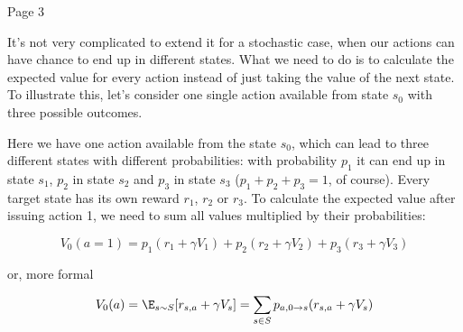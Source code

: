 Page 3

It’s not very complicated to extend it for a stochastic case, when our
actions can have chance to end up in different states. What we need to do is to
calculate the expected value for every action instead of just taking the value
of the next state. To illustrate this, let’s consider one single action
available from state \begin{math}s_0\end{math} with three possible outcomes.

Here we have one action available from the state \begin{math}s_0\end{math}, which can lead to three
different states with different probabilities: with probability \begin{math}p_1\end{math} it can end up
in state \begin{math}s_1\end{math}, \begin{math}p_2\end{math} in state \begin{math}s_2\end{math} and 
\begin{math}p_3\end{math} in state \begin{math}s_3\end{math} (\begin{math}p_1+p_2+p_3=1\end{math}, of course). Every
target state has its own reward \begin{math}r_1\end{math}, \begin{math}r_2\end{math} or \begin{math}r_3\end{math}. To calculate the expected value
after issuing action 1, we need to sum all values multiplied by their probabilities:


\begin{equation*}
  V_0(a=1) = p_1(r_1 + \gamma V_1) + p_2(r_2 + \gamma V_2) + p_3(r_3 + \gamma
  V_3)
\end{equation*}

or, more formal

\begin{equation*}
  V_0(a) = \E_{s \sim S}[r_{s,a} + \gamma V_s] = \sum_{s\in S} p_{a,0 \rightarrow s}(r_{s,a} + \gamma
  V_s)
\end{equation*}

